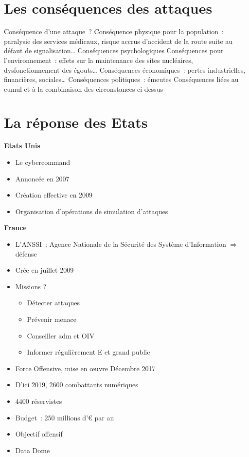 \documentclass[a4paper,11pt]{report}
\begin{document}
\section{Les conséquences des attaques}
Conséquence d’une attaque ?
Conséquence physique pour la population : paralysie des services médicaux, risque accrus d’accident de la route suite au défaut de signalisation…
Conséquences psychologiques
Conséquences pour l’environnement : effets sur la maintenance des sites nucléaires, dysfonctionnement des égouts…
Conséquences économiques : pertes industrielles, financières, sociales…
Conséquences politiques : émeutes
Conséquences liées au cumul et à la combinaison des circonstances ci-dessus
\section{La réponse des Etats}
\textbf{Etats Unis}
\begin{itemize}
    \item Le cybercommand\\
    \item Annoncée en 2007\\
    \item Création effective en 2009\\
    \item Organisation d’opérations de simulation d’attaques \\
\end{itemize}
  
\textbf{France}
\begin{itemize}
    \item L’ANSSI : Agence Nationale de la Sécurité des Système d’Information $\Rightarrow$ défense
    \item Crée en juillet 2009
    \item Missions ?
    \begin{itemize}
        \item Détecter attaques
        \item Prévenir menace
        \item Conseiller adm et OIV
        \item Informer régulièrement E et grand public
    \end{itemize}
    \item Force Offensive, mise en œuvre Décembre 2017
    \item D’ici 2019, 2600 combattants numériques
    \item 4400 réservistes
    \item Budget : 250 millions d’€ par an
    \item Objectif offensif
    \item Data Dome
\end{itemize}
\end{document}
